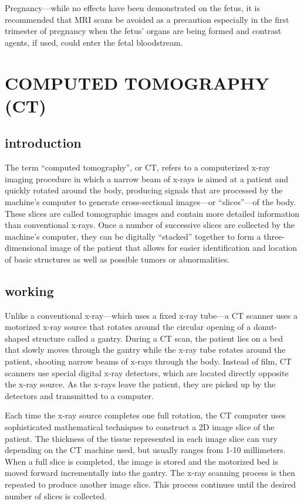 \documentclass{article}
\begin{document}
Pregnancy—while no effects have been demonstrated on the fetus, it is recommended that MRI scans be avoided as a precaution especially in the first trimester of pregnancy when the fetus’ organs are being formed and contrast agents, if used, could enter the fetal bloodstream.
\clearpage

\section{COMPUTED TOMOGRAPHY (CT)}

\subsection{introduction}
The term “computed tomography”, or CT, refers to a computerized x-ray imaging procedure in which a narrow beam of x-rays is aimed at a patient and quickly rotated around the body, producing signals that are processed by the machine’s computer to generate cross-sectional images—or “slices”—of the body. These slices are called tomographic images and contain more detailed information than conventional x-rays. Once a number of successive slices are collected by the machine’s computer, they can be digitally “stacked” together to form a three-dimensional image of the patient that allows for easier identification and location of basic structures as well as possible tumors or abnormalities.


\subsection{working}

Unlike a conventional x-ray—which uses a fixed x-ray tube—a CT scanner uses a motorized x-ray source that rotates around the circular opening of a donut-shaped structure called a gantry. During a CT scan, the patient lies on a bed that slowly moves through the gantry while the x-ray tube rotates around the patient, shooting narrow beams of x-rays through the body. Instead of film, CT scanners use special digital x-ray detectors, which are located directly opposite the x-ray source. As the x-rays leave the patient, they are picked up by the detectors and transmitted to a computer.

Each time the x-ray source completes one full rotation, the CT computer uses sophisticated mathematical techniques to construct a 2D image slice of the patient. The thickness of the tissue represented in each image slice can vary depending on the CT machine used, but usually ranges from 1-10 millimeters. When a full slice is completed, the image is stored and the motorized bed is moved forward incrementally into the gantry. The x-ray scanning process is then repeated to produce another image slice. This process continues until the desired number of slices is collected.
\end{document}
